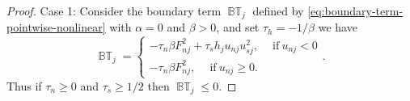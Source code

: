 \documentclass[10pt,a4paper]{amsart}
\begin{document}
\begin{proof}
Case 1:
    Consider the boundary term  $\operatorname{\mathbb{BT}}_j$ defined by \eqref{eq:boundary-term-pointwise-nonlinear} with $\alpha= 0$ and $\beta >0 $, and set $\tau_h = -1/\beta$
     we have
     $$
      \operatorname{\mathbb{BT}}_j =
\begin{cases}
     -\tau_n \beta F_{nj}^2 + \tau_s h_j u_{nj} u_{sj}^2, \quad \ \text{if} \ u_{nj} < 0\\
%     
     -\tau_n \beta F_{nj}^2  , \quad \ \text{if} \ u_{nj} \ge  0.
     \end{cases}.
     $$
     Thus if $\tau_n \ge 0$ and $\tau_s \ge 1/2$ then $\operatorname{\mathbb{BT}}_j\le 0$.
     


\end{proof}
\end{document}

